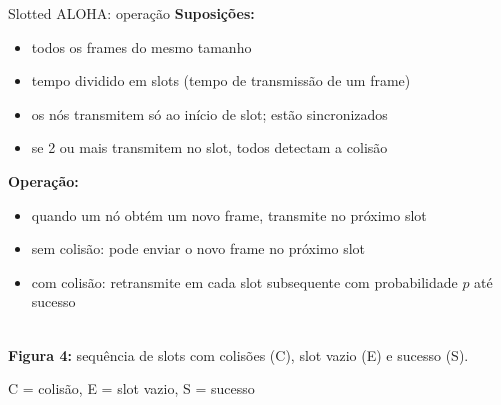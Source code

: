 \documentclass[aspectratio=169,11pt]{beamer}
\begin{document}
\begin{frame}{Slotted ALOHA: operação}
  \textbf{Suposições:}
  \begin{itemize}
    \item todos os frames do mesmo tamanho
    \item tempo dividido em slots (tempo de transmissão de um frame)
    \item os nós transmitem só ao início de slot; estão sincronizados
    \item se 2 ou mais transmitem no slot, todos detectam a colisão
  \end{itemize}
  \textbf{Operação:}
  \begin{itemize}
    \item quando um nó obtém um novo frame, transmite no próximo slot
    \item sem colisão: pode enviar o novo frame no próximo slot
    \item com colisão: retransmite em cada slot subsequente com probabilidade $p$ até sucesso
  \end{itemize}
  \begin{center}
    \\[1mm]
    {\scriptsize \textbf{Figura 4:} sequência de slots com colisões (C), slot vazio (E) e sucesso (S).}
  \end{center}
  \begin{center}
    \scriptsize C = colisão, E = slot vazio, S = sucesso
  \end{center}
\end{frame}
\end{document}
